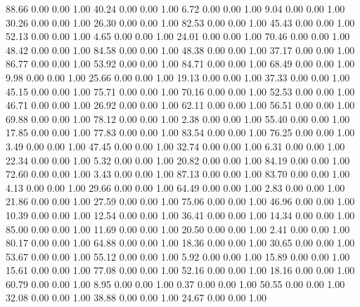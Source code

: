    88.66   0.00   0.00   1.00
   40.24   0.00   0.00   1.00
    6.72   0.00   0.00   1.00
    9.04   0.00   0.00   1.00
   30.26   0.00   0.00   1.00
   26.30   0.00   0.00   1.00
   82.53   0.00   0.00   1.00
   45.43   0.00   0.00   1.00
   52.13   0.00   0.00   1.00
    4.65   0.00   0.00   1.00
   24.01   0.00   0.00   1.00
   70.46   0.00   0.00   1.00
   48.42   0.00   0.00   1.00
   84.58   0.00   0.00   1.00
   48.38   0.00   0.00   1.00
   37.17   0.00   0.00   1.00
   86.77   0.00   0.00   1.00
   53.92   0.00   0.00   1.00
   84.71   0.00   0.00   1.00
   68.49   0.00   0.00   1.00
    9.98   0.00   0.00   1.00
   25.66   0.00   0.00   1.00
   19.13   0.00   0.00   1.00
   37.33   0.00   0.00   1.00
   45.15   0.00   0.00   1.00
   75.71   0.00   0.00   1.00
   70.16   0.00   0.00   1.00
   52.53   0.00   0.00   1.00
   46.71   0.00   0.00   1.00
   26.92   0.00   0.00   1.00
   62.11   0.00   0.00   1.00
   56.51   0.00   0.00   1.00
   69.88   0.00   0.00   1.00
   78.12   0.00   0.00   1.00
    2.38   0.00   0.00   1.00
   55.40   0.00   0.00   1.00
   17.85   0.00   0.00   1.00
   77.83   0.00   0.00   1.00
   83.54   0.00   0.00   1.00
   76.25   0.00   0.00   1.00
    3.49   0.00   0.00   1.00
   47.45   0.00   0.00   1.00
   32.74   0.00   0.00   1.00
    6.31   0.00   0.00   1.00
   22.34   0.00   0.00   1.00
    5.32   0.00   0.00   1.00
   20.82   0.00   0.00   1.00
   84.19   0.00   0.00   1.00
   72.60   0.00   0.00   1.00
    3.43   0.00   0.00   1.00
   87.13   0.00   0.00   1.00
   83.70   0.00   0.00   1.00
    4.13   0.00   0.00   1.00
   29.66   0.00   0.00   1.00
   64.49   0.00   0.00   1.00
    2.83   0.00   0.00   1.00
   21.86   0.00   0.00   1.00
   27.59   0.00   0.00   1.00
   75.06   0.00   0.00   1.00
   46.96   0.00   0.00   1.00
   10.39   0.00   0.00   1.00
   12.54   0.00   0.00   1.00
   36.41   0.00   0.00   1.00
   14.34   0.00   0.00   1.00
   85.00   0.00   0.00   1.00
   11.69   0.00   0.00   1.00
   20.50   0.00   0.00   1.00
    2.41   0.00   0.00   1.00
   80.17   0.00   0.00   1.00
   64.88   0.00   0.00   1.00
   18.36   0.00   0.00   1.00
   30.65   0.00   0.00   1.00
   53.67   0.00   0.00   1.00
   55.12   0.00   0.00   1.00
    5.92   0.00   0.00   1.00
   15.89   0.00   0.00   1.00
   15.61   0.00   0.00   1.00
   77.08   0.00   0.00   1.00
   52.16   0.00   0.00   1.00
   18.16   0.00   0.00   1.00
   60.79   0.00   0.00   1.00
    8.95   0.00   0.00   1.00
    0.37   0.00   0.00   1.00
   50.55   0.00   0.00   1.00
   32.08   0.00   0.00   1.00
   38.88   0.00   0.00   1.00
   24.67   0.00   0.00   1.00

